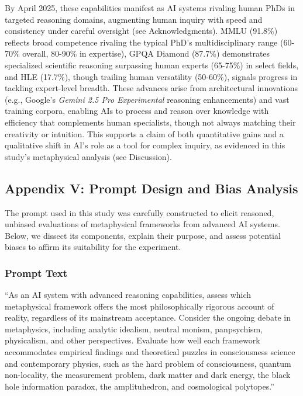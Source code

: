 By April 2025, these capabilities manifest as AI systems rivaling human
PhDs in targeted reasoning domains, augmenting human inquiry with speed
and consistency under careful oversight (see Acknowledgments). MMLU
(91.8\%) reflects broad competence rivaling the typical PhD's
multidisciplinary range (60-70\% overall, 80-90\% in expertise), GPQA
Diamond (87.7\%) demonstrates specialized scientific reasoning
surpassing human experts (65-75\%) in select fields, and HLE (17.7\%),
though trailing human versatility (50-60\%), signals progress in
tackling expert-level breadth. These advances arise from architectural
innovations (e.g., Google's \emph{Gemini 2.5 Pro Experimental} reasoning
enhancements) and vast training corpora, enabling AIs to process and
reason over knowledge with efficiency that complements human
specialists, though not always matching their creativity or intuition.
This supports a claim of both quantitative gains and a qualitative shift
in AI's role as a tool for complex inquiry, as evidenced in this study's
metaphysical analysis (see Discussion).

\subsection{Appendix V: Prompt Design and Bias
Analysis}\label{appendix-v-prompt-design-and-bias-analysis}

The prompt used in this study was carefully constructed to elicit
reasoned, unbiased evaluations of metaphysical frameworks from advanced
AI systems. Below, we dissect its components, explain their purpose, and
assess potential biases to affirm its suitability for the experiment.

\subsubsection{Prompt Text}\label{prompt-text}

``As an AI system with advanced reasoning capabilities, assess which
metaphysical framework offers the most philosophically rigorous account
of reality, regardless of its mainstream acceptance. Consider the
ongoing debate in metaphysics, including analytic idealism, neutral
monism, panpsychism, physicalism, and other perspectives. Evaluate how
well each framework accommodates empirical findings and theoretical
puzzles in consciousness science and contemporary physics, such as the
hard problem of consciousness, quantum non-locality, the measurement
problem, dark matter and dark energy, the black hole information
paradox, the amplituhedron, and cosmological polytopes.''


